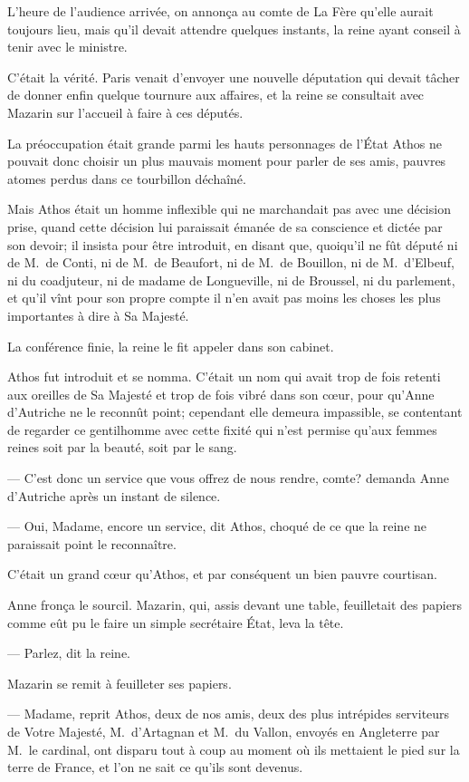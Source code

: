 L'heure de l'audience arrivée, on annonça au comte de La Fère qu'elle aurait toujours lieu, mais qu'il devait attendre quelques instants, la reine ayant conseil à tenir avec le ministre.

C'était la vérité. Paris venait d'envoyer une nouvelle députation qui devait tâcher de donner enfin quelque tournure aux affaires, et la reine se consultait avec Mazarin sur l'accueil à faire à ces députés.

La préoccupation était grande parmi les hauts personnages de l'État Athos ne pouvait donc choisir un plus mauvais moment pour parler de ses amis, pauvres atomes perdus dans ce tourbillon déchaîné.

Mais Athos était un homme inflexible qui ne marchandait pas avec une décision prise, quand cette décision lui paraissait émanée de sa conscience et dictée par son devoir; il insista pour être introduit, en disant que, quoiqu'il ne fût député ni de M.~de Conti, ni de M.~de Beaufort, ni de M.~de Bouillon, ni de M.~d'Elbeuf, ni du coadjuteur, ni de madame de Longueville, ni de Broussel, ni du parlement, et qu'il vînt pour son propre compte il n'en avait pas moins les choses les plus importantes à dire à Sa Majesté.

La conférence finie, la reine le fit appeler dans son cabinet.

Athos fut introduit et se nomma. C'était un nom qui avait trop de fois retenti aux oreilles de Sa Majesté et trop de fois vibré dans son cœur, pour qu'Anne d'Autriche ne le reconnût point; cependant elle demeura impassible, se contentant de regarder ce gentilhomme avec cette fixité qui n'est permise qu'aux femmes reines soit par la beauté, soit par le sang.

— C'est donc un service que vous offrez de nous rendre, comte? demanda Anne d'Autriche après un instant de silence.

— Oui, Madame, encore un service, dit Athos, choqué de ce que la reine ne paraissait point le reconnaître.

C'était un grand cœur qu'Athos, et par conséquent un bien pauvre courtisan.

Anne fronça le sourcil. Mazarin, qui, assis devant une table, feuilletait des papiers comme eût pu le faire un simple secrétaire État, leva la tête.

— Parlez, dit la reine.

Mazarin se remit à feuilleter ses papiers.

— Madame, reprit Athos, deux de nos amis, deux des plus intrépides serviteurs de Votre Majesté, M.~d'Artagnan et M.~du Vallon, envoyés en Angleterre par M.~le cardinal, ont disparu tout à coup au moment où ils mettaient le pied sur la terre de France, et l'on ne sait ce qu'ils sont devenus.

